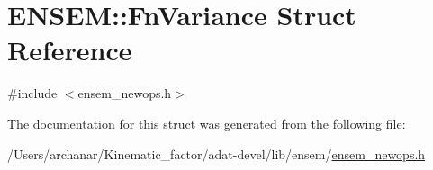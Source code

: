 \hypertarget{structENSEM_1_1FnVariance}{}\section{E\+N\+S\+EM\+:\+:Fn\+Variance Struct Reference}
\label{structENSEM_1_1FnVariance}


{\ttfamily \#include $<$ensem\+\_\+newops.\+h$>$}



The documentation for this struct was generated from the following file\+:\begin{DoxyCompactItemize}
\item 
/\+Users/archanar/\+Kinematic\+\_\+factor/adat-\/devel/lib/ensem/\mbox{\hyperlink{adat-devel_2lib_2ensem_2ensem__newops_8h}{ensem\+\_\+newops.\+h}}\end{DoxyCompactItemize}
